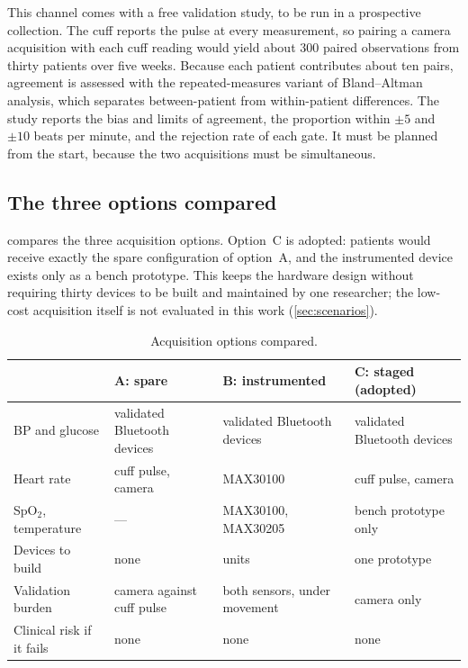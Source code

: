 This channel comes with a free validation study, to be run in a prospective collection. The cuff reports the pulse at every measurement, so pairing a camera acquisition with each cuff reading would yield about 300 paired observations from thirty patients over five weeks. Because each patient contributes about ten pairs, agreement is assessed with the repeated-measures variant of Bland--Altman analysis, which separates between-patient from within-patient differences. The study reports the bias and limits of agreement, the proportion within $\pm 5$ and $\pm 10$ beats per minute, and the rejection rate of each gate. It must be planned from the start, because the two acquisitions must be simultaneous.

\subsection{The three options compared}\label{sec:options}

 compares the three acquisition options. Option~C is adopted: patients would receive exactly the spare configuration of option~A, and the instrumented device exists only as a bench prototype. This keeps the hardware design without requiring thirty devices to be built and maintained by one researcher; the low-cost acquisition itself is not evaluated in this work (\cref{sec:scenarios}).

\begin{table}[htbp]
\centering\footnotesize
\caption{Acquisition options compared.}\label{tab:options}
\begin{tabularx}{\textwidth}{@{}>{\raggedright\arraybackslash}p{3.0cm} >{\raggedright\arraybackslash}X >{\raggedright\arraybackslash}X >{\raggedright\arraybackslash}X@{}}
\toprule
 & \textbf{A: spare} & \textbf{B: instrumented} & \textbf{C: staged (adopted)} \\
\midrule
BP and glucose & validated Bluetooth devices & validated Bluetooth devices & validated Bluetooth devices \\
Heart rate & cuff pulse, camera & MAX30100 & cuff pulse, camera \\
SpO$_2$, temperature & --- & MAX30100, MAX30205 & bench prototype only \\
Devices to build & none & 30 units & one prototype \\
Validation burden & camera against cuff pulse & both sensors, under movement & camera only \\
Clinical risk if it fails & none & none & none \\
\bottomrule
\end{tabularx}
\end{table}

